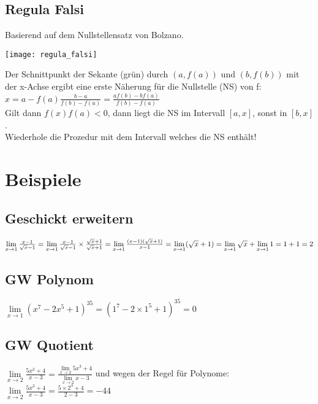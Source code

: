 \documentclass[../main.tex]{subfiles}
\begin{document}
\subsection{Regula Falsi}
Basierend auf dem Nullstellensatz von Bolzano.

\begin{minipage}{0.5\textwidth}
        \texttt{[image: regula\_falsi]}
\end{minipage} \hfill
\begin{minipage}{0.45\textwidth}
    Der Schnittpunkt der Sekante (grün) durch $(a, f(a))$ und $(b, f(b))$ mit der x-Achse ergibt eine erste Näherung für die Nullstelle (NS) von f: \\ [7pt]
    $x = a-f(a) \frac{b-a}{f(b)-f(a)} = \frac{af(b)-bf(a)}{f(b)-f(a)}$  \\ [7pt]
    Gilt dann $f(x)f(a)<0$, dann liegt die NS im Intervall $[a,x]$, sonst in $[b,x]$. \\
    Wiederhole die Prozedur mit dem Intervall welches die NS enthält!
\end{minipage}


\section{Beispiele}
\subsection{Geschickt erweitern}
\begin{math}
    \lim\limits_{x\to 1} \frac{x-1}{\sqrt{x}-1} =
    \lim\limits_{x\to 1} \frac{x-1}{\sqrt{x}-1} \times \frac{\sqrt{x}+1}{\sqrt{x}+1} =
    \lim\limits_{x\to 1} \frac{(x-1)(\sqrt{x}+1)}{x-1} = \\ [7pt]
    \lim\limits_{x\to 1} (\sqrt{x}+1) =
    \lim\limits_{x\to 1} \sqrt{x} + \lim\limits_{x\to 1} 1 =
    1 + 1 = 2
\end{math}

\subsection{GW Polynom}
\label{sec:GW_Polynom}
\begin{math}
    \lim\limits_{x\to 1} (x^7 - 2x^5 + 1)^{35} = (1^7 - 2 \times 1^5 +  1)^{35} = 0
\end{math}

\subsection{GW Quotient}
\label{sec:GW_Quotient}
\begin{math}
    \lim\limits_{x\to 2} \frac{5x^3 + 4}{x -3} = \frac{\lim\limits_{x\to 2}5x^3 + 4}{\lim\limits_{x\to 2}x -3}
\end{math}
und wegen der Regel für Polynome: \\ [7pt]
\begin{math}
    \lim\limits_{x\to 2} \frac{5x^3 + 4}{x -3} = \frac{5 \times 2^3 + 4}{2 -3} = -44
\end{math}
\end{document}
